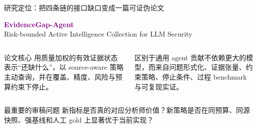 \begin{frame}{研究定位：把四条链的接口缺口变成一篇可证伪论文}
\begin{center}
\Large\textcolor{Purple}{\textbf{EvidenceGap-Agent}}\\[0.4em]
\large Risk-bounded Active Intelligence Collection for LLM Security
\end{center}

\vspace{0.8em}
\begin{columns}[T,onlytextwidth]
\begin{block}{论文核心}
用质量加权的有效证据状态表示“还缺什么”，以 source-aware 策略主动查询，并在覆盖、精度、风险与预算约束下停止。
\end{block}
\begin{block}{区别于通用 agent}
贡献不依赖更大的模型，而来自问题形式化、证据张量、约束策略、停止条件、过程 benchmark 与可复现实证。
\end{block}
\end{columns}

\begin{alertblock}{最重要的审稿问题}
新指标是否真的对应分析师价值？新策略是否在同预算、同源快照、强基线和人工 gold 上显著优于当前实现？
\end{alertblock}
\end{frame}
